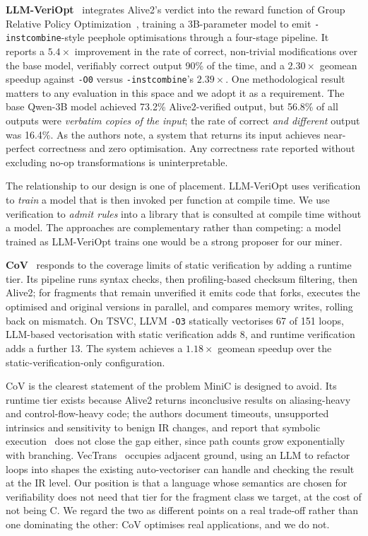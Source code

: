 \documentclass[conference]{IEEEtran}
\begin{document}
\textbf{LLM-VeriOpt}~\cite{llmveriopt} integrates Alive2's verdict into the
reward function of Group Relative Policy Optimization~\cite{grpo}, training a
3B-parameter model to emit \texttt{-instcombine}-style peephole optimisations
through a four-stage pipeline. It reports a $5.4\times$ improvement in the rate
of correct, non-trivial modifications over the base model, verifiably correct
output 90\% of the time, and a $2.30\times$ geomean speedup against
\texttt{-O0} versus \texttt{-instcombine}'s $2.39\times$. One methodological
result matters to any evaluation in this space and we adopt it as a
requirement. The base Qwen-3B model achieved 73.2\% Alive2-verified output, but
56.8\% of all outputs were \emph{verbatim copies of the input}; the rate of
correct \emph{and different} output was 16.4\%. As the authors note, a system
that returns its input achieves near-perfect correctness and zero optimisation.
Any correctness rate reported without excluding no-op transformations is
uninterpretable.

The relationship to our design is one of placement. LLM-VeriOpt uses
verification to \emph{train} a model that is then invoked per function at
compile time. We use verification to \emph{admit rules} into a library that is
consulted at compile time without a model. The approaches are complementary
rather than competing: a model trained as LLM-VeriOpt trains one would be a
strong proposer for our miner.

\textbf{CoV}~\cite{cov} responds to the coverage limits of static verification
by adding a runtime tier. Its pipeline runs syntax checks, then profiling-based
checksum filtering, then Alive2; for fragments that remain unverified it emits
code that forks, executes the optimised and original versions in parallel, and
compares memory writes, rolling back on mismatch. On TSVC, LLVM \texttt{-O3}
statically vectorises 67 of 151 loops, LLM-based vectorisation with static
verification adds 8, and runtime verification adds a further 13. The system
achieves a $1.18\times$ geomean speedup over the static-verification-only
configuration.

CoV is the clearest statement of the problem MiniC is designed to avoid. Its
runtime tier exists because Alive2 returns inconclusive results on
aliasing-heavy and control-flow-heavy code; the authors document timeouts,
unsupported intrinsics and sensitivity to benign IR changes, and report that
symbolic execution~\cite{klee} does not close the gap either, since path counts
grow exponentially with branching. VecTrans~\cite{vectrans} occupies adjacent
ground, using an LLM to refactor loops into shapes the existing
auto-vectoriser can handle and checking the result at the IR level. Our position is
that a language whose semantics are chosen for verifiability does not need that
tier for the fragment class we target, at the cost of not being C. We regard
the two as different points on a real trade-off rather than one dominating the
other: CoV optimises real applications, and we do not.
\end{document}
